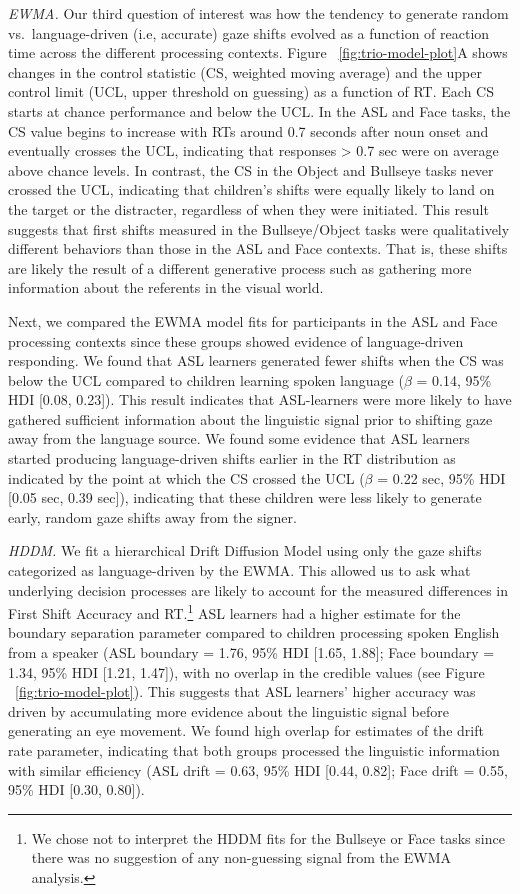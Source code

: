 \documentclass[english,floatsintext,man]{apa6}
\begin{document}
\emph{EWMA.} Our third question of interest was how the tendency to
generate random vs.~language-driven (i.e, accurate) gaze shifts evolved
as a function of reaction time across the different processing contexts.
Figure ~\ref{fig:trio-model-plot}A shows changes in the control
statistic (CS, weighted moving average) and the upper control limit
(UCL, upper threshold on guessing) as a function of RT. Each CS starts
at chance performance and below the UCL. In the ASL and Face tasks, the
CS value begins to increase with RTs around 0.7 seconds after noun onset
and eventually crosses the UCL, indicating that responses \textgreater{}
0.7 sec were on average above chance levels. In contrast, the CS in the
Object and Bullseye tasks never crossed the UCL, indicating that
children's shifts were equally likely to land on the target or the
distracter, regardless of when they were initiated. This result suggests
that first shifts measured in the Bullseye/Object tasks were
qualitatively different behaviors than those in the ASL and Face
contexts. That is, these shifts are likely the result of a different
generative process such as gathering more information about the
referents in the visual world.

Next, we compared the EWMA model fits for participants in the ASL and
Face processing contexts since these groups showed evidence of
language-driven responding. We found that ASL learners generated fewer
shifts when the CS was below the UCL compared to children learning
spoken language (\(\beta\) = 0.14, 95\% HDI {[}0.08, 0.23{]}). This
result indicates that ASL-learners were more likely to have gathered
sufficient information about the linguistic signal prior to shifting
gaze away from the language source. We found some evidence that ASL
learners started producing language-driven shifts earlier in the RT
distribution as indicated by the point at which the CS crossed the UCL
(\(\beta\) = 0.22 sec, 95\% HDI {[}0.05 sec, 0.39 sec{]}), indicating
that these children were less likely to generate early, random gaze
shifts away from the signer.

\emph{HDDM.} We fit a hierarchical Drift Diffusion Model using only the
gaze shifts categorized as language-driven by the EWMA. This allowed us
to ask what underlying decision processes are likely to account for the
measured differences in First Shift Accuracy and RT.\footnote{We chose
  not to interpret the HDDM fits for the Bullseye or Face tasks since
  there was no suggestion of any non-guessing signal from the EWMA
  analysis.} ASL learners had a higher estimate for the boundary
separation parameter compared to children processing spoken English from
a speaker (ASL boundary = 1.76, 95\% HDI {[}1.65, 1.88{]}; Face boundary
= 1.34, 95\% HDI {[}1.21, 1.47{]}), with no overlap in the credible
values (see Figure ~\ref{fig:trio-model-plot}). This suggests that ASL
learners' higher accuracy was driven by accumulating more evidence about
the linguistic signal before generating an eye movement. We found high
overlap for estimates of the drift rate parameter, indicating that both
groups processed the linguistic information with similar efficiency (ASL
drift = 0.63, 95\% HDI {[}0.44, 0.82{]}; Face drift = 0.55, 95\% HDI
{[}0.30, 0.80{]}).
\end{document}
